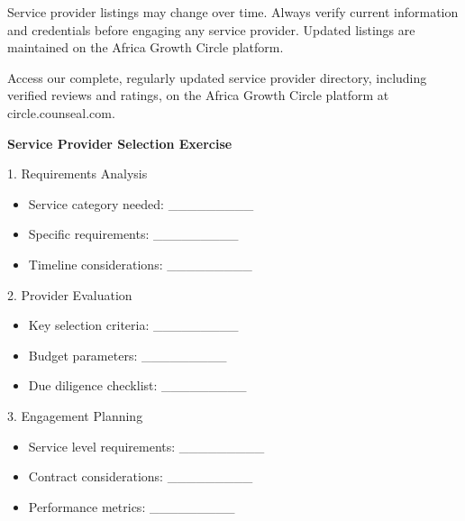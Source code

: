 \begin{warningbox}
Service provider listings may change over time. Always verify current information and credentials before engaging any service provider. Updated listings are maintained on the Africa Growth Circle platform.
\end{warningbox}

\vspace{1em}

\begin{communitybox}
Access our complete, regularly updated service provider directory, including verified reviews and ratings, on the Africa Growth Circle platform at circle.counseal.com.
\end{communitybox}

\vspace{1em}

\begin{workshopbox}
\textbf{Service Provider Selection Exercise}

1. Requirements Analysis
\begin{itemize}[leftmargin=*]
    \item Service category needed: \_\_\_\_\_\_\_\_\_
    \item Specific requirements: \_\_\_\_\_\_\_\_\_
    \item Timeline considerations: \_\_\_\_\_\_\_\_\_
\end{itemize}

2. Provider Evaluation
\begin{itemize}[leftmargin=*]
    \item Key selection criteria: \_\_\_\_\_\_\_\_\_
    \item Budget parameters: \_\_\_\_\_\_\_\_\_
    \item Due diligence checklist: \_\_\_\_\_\_\_\_\_
\end{itemize}

3. Engagement Planning
\begin{itemize}[leftmargin=*]
    \item Service level requirements: \_\_\_\_\_\_\_\_\_
    \item Contract considerations: \_\_\_\_\_\_\_\_\_
    \item Performance metrics: \_\_\_\_\_\_\_\_\_
\end{itemize}
\end{workshopbox}